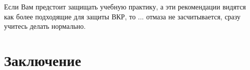 \noindent Если Вам предстоит защищать учебную практику, а эти рекомендации видятся как более подходящие для защиты ВКР, то ... отмаза не засчитывается, сразу учитесь делать нормально.
\section*{Заключение}


\setmonofont[Mapping=tex-text]{CMU Typewriter Text}
  
  

